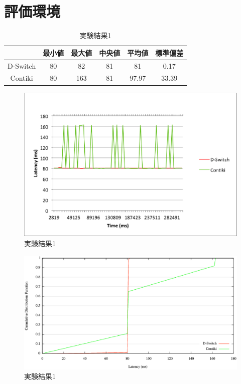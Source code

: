 \section{評価環境}


\begin{table}[htb]
  \centering
  \caption{実験結果1}
  \begin{tabular}{|c||c|c|c|c|c|} \hline
    \backslashbox{}{} & 最小値 & 最大値 & 中央値 & 平均値 & 標準偏差 \\ \hline \hline
    D-Switch & 80 & 82 & 81 & 81 & 0.17 \\ \hline
    Contiki & 80 & 163 & 81 & 97.97 & 33.39 \\ \hline
  \end{tabular}
  \label{tab:latency1}
\end{table}

\begin{figure}[htbp]
 \begin{center}
  \includegraphics[width=120mm]{./images/latency1.eps}
 \end{center}
 \caption{実験結果1}
 \label{fig:latency1}
\end{figure}

\begin{figure}[htbp]
 \begin{center}
  \includegraphics[width=120mm]{./images/cdf1.eps}
 \end{center}
 \caption{実験結果1}
 \label{fig:cdf1}
\end{figure}


